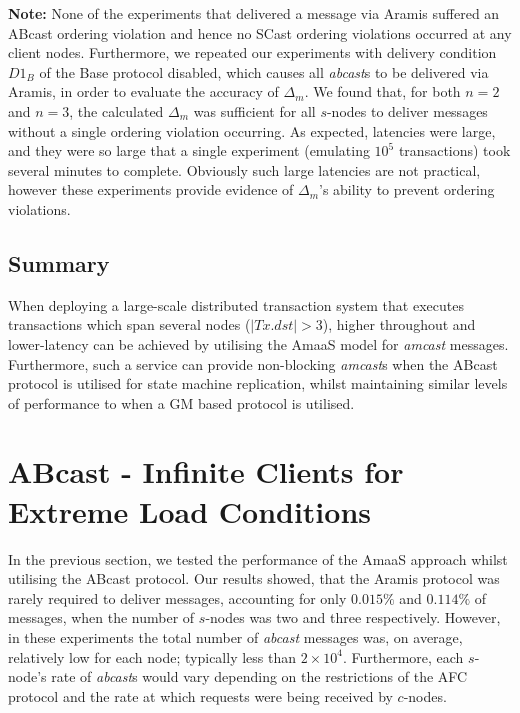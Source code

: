 	\textbf{Note:} None of the experiments that delivered a message via \textsf{Aramis} suffered an \textsf{ABcast} ordering violation and hence no SCast ordering violations occurred at any client nodes.  Furthermore, we repeated our experiments with delivery condition $D1_B$ of the \textsf{Base} protocol disabled, which causes all \emph{abcast}s to be delivered via \textsf{Aramis}, in order to evaluate the accuracy of $\Delta_m$.  We found that, for both $n=2$ and $n=3$, the calculated $\Delta_m$ was sufficient for all $s$-nodes to deliver messages without a single ordering violation occurring.  As expected, latencies were large, and they were so large that a single experiment (emulating $10^5$ transactions) took several minutes to complete.  Obviously such large latencies are not practical, however these experiments provide evidence of $\Delta_m$'s ability to prevent ordering violations.  
		
	\subsection{Summary}
	When deploying a large-scale distributed transaction system that executes transactions which span several nodes ($|Tx.dst| > 3$), higher throughout and lower-latency can be achieved by utilising the \textsf{AmaaS} model for \emph{amcast} messages.  Furthermore, such a service can provide non-blocking \emph{amcast}s when the \textsf{ABcast} protocol is utilised for state machine replication, whilst maintaining similar levels of performance to when a GM based protocol is utilised.  

\section{ABcast - Infinite Clients for Extreme Load Conditions}\label{sec:infinite_clients_eval}
    In the previous section, we tested the performance of the \textsf{AmaaS} approach whilst utilising the \textsf{ABcast} protocol.  Our results showed, that the \textsf{Aramis} protocol was rarely required to deliver messages, accounting for only $0.015\%$ and $0.114\%$ of messages, when the number of $s$-nodes was two and three respectively.  However, in these experiments the total number of \emph{abcast} messages was, on average, relatively low for each node; typically less than $2 \times 10^4$.  Furthermore, each $s$-node's rate of \emph{abcast}s would vary depending on the restrictions of the AFC protocol and the rate at which requests were being received by $c$-nodes.  
    

